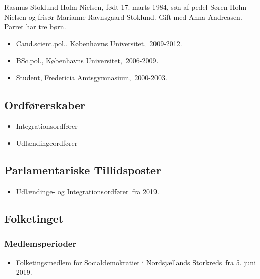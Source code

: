 \documentclass[11pt, a4paper]{awesome-cv}
\begin{document}
\makecvheader[R]
\makelettertitle
\begin{cvletter}
Rasmus Stoklund Holm-Nielsen, født 17. marts 1984, søn af pedel Søren Holm-Nielsen og frisør Marianne Ravnsgaard Stoklund. Gift med Anna Andreasen. Parret har tre børn.

\begin{itemize}
\item Cand.scient.pol., Københavns Universitet, 2009-2012.
\item BSc.pol., Københavns Universitet, 2006-2009.
\item Student, Fredericia Amtsgymnasium, 2000-2003.
\end{itemize}
\subsection*{Ordførerskaber}
\begin{itemize}
\item Integrationsordfører
\item Udlændingeordfører
\end{itemize}
\subsection*{Parlamentariske Tillidsposter}
\begin{itemize}
\item Udlændinge- og Integrationsordfører fra 2019.
\end{itemize}
\subsection*{Folketinget}
\subsubsection*{Medlemsperioder}
\begin{itemize}
\item Folketingsmedlem for Socialdemokratiet i Nordsjællands Storkreds fra 5. juni 2019.
\end{itemize}

\end{cvletter}
\end{document}
